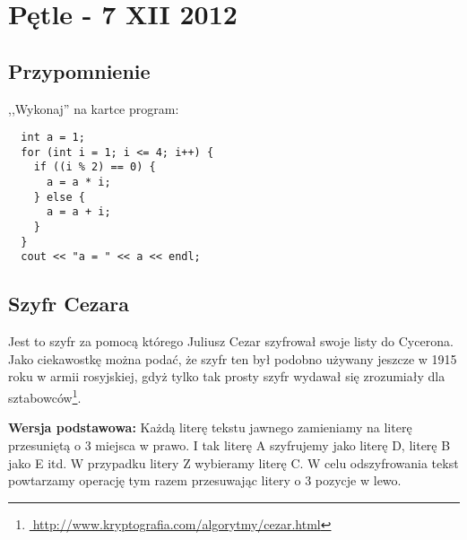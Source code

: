\documentclass[a4paper, 10pt, pdftex, dvipsnames]{scrartcl}
\newcommand{\sector}[3]{
    \filldraw[#1, wired]
      (0, 0) --
      ({18 * #2} :                   #3) arc
      ({18 * #2} : {18 * (#2 + 1)} : #3) -- cycle;
}
\begin{document}
\section*{Pętle - 7 XII 2012}

\subsection*{Przypomnienie}

,,Wykonaj'' na kartce program:

\begin{verbatim}
  int a = 1;
  for (int i = 1; i <= 4; i++) {
    if ((i % 2) == 0) {
      a = a * i;
    } else {
      a = a + i;
    }
  }
  cout << "a = " << a << endl;
\end{verbatim}

\subsection*{Szyfr Cezara}

Jest to szyfr za pomocą którego Juliusz Cezar szyfrował swoje listy do Cycerona. Jako ciekawostkę można podać, że szyfr ten był podobno używany jeszcze w 1915 roku w armii rosyjskiej, gdyż tylko tak prosty szyfr wydawał się zrozumiały dla sztabowców\footnote{\url{http://www.kryptografia.com/algorytmy/cezar.html}}.

\vspace{2mm}\noindent
{\bf Wersja podstawowa:} Każdą literę tekstu jawnego zamieniamy na literę przesuniętą o 3 miejsca w prawo. I tak literę A szyfrujemy jako literę D, literę B jako E itd. W przypadku litery Z wybieramy literę C. W celu odszyfrowania tekst powtarzamy operację tym razem przesuwając litery o 3 pozycje w lewo.

\begin{center}
\end{center}
\end{document}

